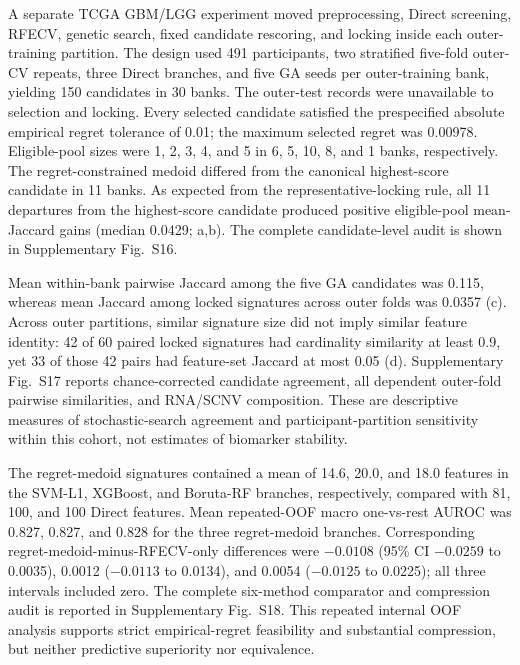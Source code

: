 A separate TCGA GBM/LGG experiment moved preprocessing, Direct screening, RFECV, genetic search, fixed candidate rescoring, and locking inside each outer-training partition. The design used 491 participants, two stratified five-fold outer-CV repeats, three Direct branches, and five GA seeds per outer-training bank, yielding 150 candidates in 30 banks. The outer-test records were unavailable to selection and locking. Every selected candidate satisfied the prespecified absolute empirical regret tolerance of 0.01; the maximum selected regret was 0.00978. Eligible-pool sizes were 1, 2, 3, 4, and 5 in 6, 5, 10, 8, and 1 banks, respectively. The regret-constrained medoid differed from the canonical highest-score candidate in 11 banks. As expected from the representative-locking rule, all 11 departures from the highest-score candidate produced positive eligible-pool mean-Jaccard gains (median 0.0429; a,b). The complete candidate-level audit is shown in Supplementary Fig.~S16.

Mean within-bank pairwise Jaccard among the five GA candidates was 0.115, whereas mean Jaccard among locked signatures across outer folds was 0.0357 (c). Across outer partitions, similar signature size did not imply similar feature identity: 42 of 60 paired locked signatures had cardinality similarity at least 0.9, yet 33 of those 42 pairs had feature-set Jaccard at most 0.05 (d). Supplementary Fig.~S17 reports chance-corrected candidate agreement, all dependent outer-fold pairwise similarities, and RNA/SCNV composition. These are descriptive measures of stochastic-search agreement and participant-partition sensitivity within this cohort, not estimates of biomarker stability.

The regret-medoid signatures contained a mean of 14.6, 20.0, and 18.0 features in the SVM-L1, XGBoost, and Boruta-RF branches, respectively, compared with 81, 100, and 100 Direct features. Mean repeated-OOF macro one-vs-rest AUROC was 0.827, 0.827, and 0.828 for the three regret-medoid branches. Corresponding regret-medoid-minus-RFECV-only differences were $-0.0108$ (95\% CI $-0.0259$ to 0.0035), 0.0012 ($-0.0113$ to 0.0134), and 0.0054 ($-0.0125$ to 0.0225); all three intervals included zero. The complete six-method comparator and compression audit is reported in Supplementary Fig.~S18. This repeated internal OOF analysis supports strict empirical-regret feasibility and substantial compression, but neither predictive superiority nor equivalence.

